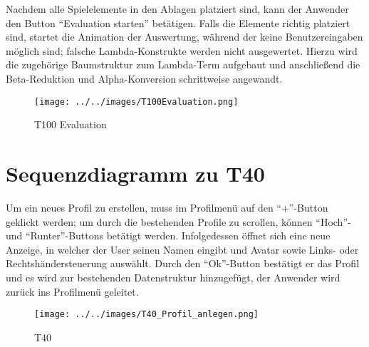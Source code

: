 Nachdem alle Spielelemente in den Ablagen platziert sind, kann der Anwender den Button \enquote{Evaluation starten} betätigen. Falls die Elemente richtig platziert sind, startet die Animation der Auswertung, während der keine Benutzereingaben möglich sind; falsche Lambda-Konstrukte werden nicht ausgewertet. Hierzu wird die zugehörige  Baumstruktur zum Lambda-Term aufgebaut und anschließend die Beta-Reduktion und Alpha-Konversion schrittweise angewandt.

\begin{figure}[!htb]
	\centering
	\texttt{[image: ../../images/T100Evaluation.png]}
	\caption{T100 Evaluation}
	\label{fig:t100evluation}
\end{figure}


\section{Sequenzdiagramm zu T40}

Um ein neues Profil zu erstellen, muss im Profilmenü auf den \enquote{+}-Button geklickt werden; um durch die bestehenden Profile zu scrollen, können \enquote{Hoch}- und \enquote{Runter}-Buttons betätigt werden. Infolgedessen öffnet sich eine neue Anzeige, in welcher der User seinen Namen eingibt und Avatar sowie Links- oder Rechtshändersteuerung auswählt. Durch den \enquote{Ok}-Button bestätigt er das Profil und es wird zur bestehenden Datenstruktur hinzugefügt, der Anwender wird zurück ins Profilmenü geleitet.

\begin{figure}[!htb]
    \centering
    \texttt{[image: ../../images/T40\_Profil\_anlegen.png]}
    \caption{T40}
    \label{fig:t100evluation}
\end{figure}